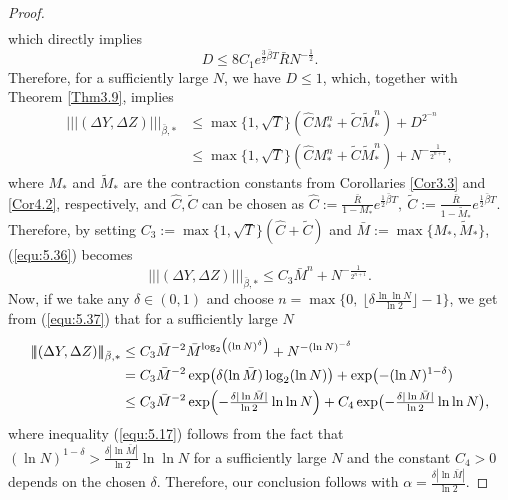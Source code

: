 \documentclass[10pt,a4paper]{amsart}
\newcommand{\bR}{\bar{R}}
\newcommand{\hC}{\hat{C}}
\newcommand{\trinm}[1]{\vert\!\vert\!\vert #1 \vert\!\vert\!\vert}
\begin{document}
\begin{proof}
\begin{align}
\end{align}
which directly implies
\begin{equation}
\label{equ:5.estD}
D \leq 8C_{1}e^{\tfrac{3}{2} \bar{\beta} T} \bR N^{-\tfrac{1}{2}}.
\end{equation}
Therefore, for a sufficiently large $N$, we have $D \leq 1$, which, together with Theorem \ref{Thm3.9}, implies
\begin{align}\nonumber
\trinm{(\Delta Y,\Delta Z)}_{\bar{\beta},*} &\leq \max\{1,\sqrt{T}\}(\hat{C}M_{*}^{n} + \tilde{C}\tilde{M}_{*}^{n}) + D^{2^{-n}}\\
&\leq \max\{1,\sqrt{T}\}(\hat{C}M_{*}^{n} + \tilde{C}\tilde{M}_{*}^{n}) + N^{-\tfrac{1}{2^{n+1}}}, \label{equ:5.36}
\end{align}
where $M_{*}$ and $\tilde{M}_{*}$ are the contraction constants from Corollaries \ref{Cor3.3} and \ref{Cor4.2}, respectively, and $\hat{C}, \tilde C$ can be chosen as
$
\hat{C} := \tfrac{\bR}{1-M_{*}}e^{\tfrac{1}{2} \bar{\beta} T},\   \tilde{C} := \tfrac{ \bR}{1-\tilde{M}_{*}}e^{\tfrac{1}{2} \bar{\beta} T}.
$
Therefore, by setting $C_{3} := \max\{1,\sqrt{T}\}(\hat{C} + \tilde{C})$ and $\bar{M} := \max\{M_{*},\tilde{M}_{*}\}$, (\ref{equ:5.36}) becomes
\begin{equation}
\label{equ:5.37}
\trinm{ (\Delta Y,\Delta Z)}_{\bar{\beta},*} \leq C_{3}\bar{M}^{n} + N^{-\tfrac{1}{2^{n+1}}}.
\end{equation}
Now, if we take any 
$\delta \in (0,1)$ and choose $n = \max\bigl\{0 , \ \lfloor \delta \frac{  \ln \ln N}{ \ln{2}}
\rfloor -1\bigr\}$, we get from (\ref{equ:5.37}) that for a sufficiently large $N$
\begin{align}
\trinm{(\Delta Y,\Delta Z)}_{\bar{\beta},*} &\leq C_{3}\bar{M}^{-2}\bar{M}^{\log_{2}\bigl((\ln{N})^{\delta}\bigr)} + N^{-(\ln{N})^{-\delta}} \nonumber \\
&= C_{3}\bar{M}^{-2}\exp\bigl(\delta(\ln{\bar{M}})\log_{2}(\ln{N})\bigr) + \exp\bigl(-(\ln{N})^{1-\delta}) \nonumber \\
&\leq C_{3}\bar{M}^{-2}\exp\Bigl(-\tfrac{\delta |\ln{\bar{M}}|}{\ln{2}}\ln{\ln{N}}\Bigr) + C_4 \exp\bigl(-\tfrac{\delta |\ln{\bar{M}}|}{\ln{2}}\ln{\ln{N}}\bigr), \label{equ:5.17}
\end{align}
where inequality (\ref{equ:5.17}) follows from the fact that
$(\ln{N})^{1-\delta} > \tfrac{\delta |\ln{\bar{M}}|}{\ln{2}} \ln{\ln{N}}$ for a sufficiently large $N$ and the constant $C_{4}>0$ depends on the chosen $\delta$. Therefore, our conclusion follows with $\alpha = \tfrac{\delta |\ln{\bar{M}}|}{\ln{2}}.$




\end{proof}
\end{document}
